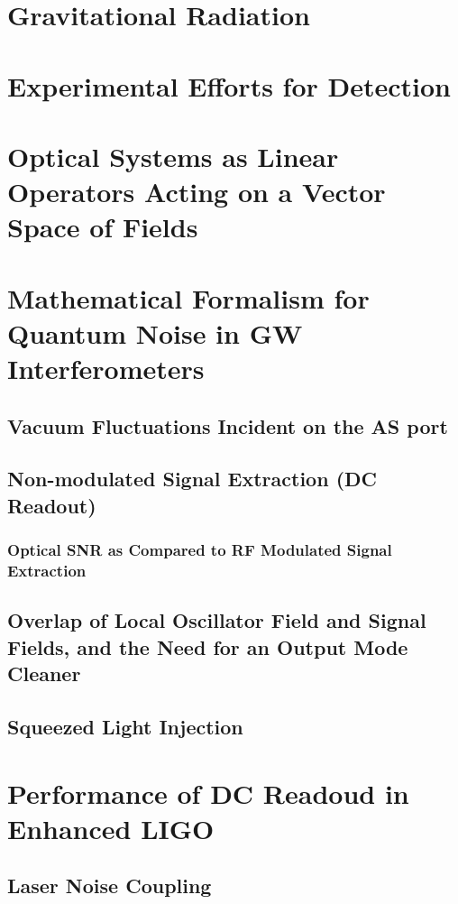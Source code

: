 

\chapter{Gravitational Radiation}

\chapter{Experimental Efforts for Detection}

\chapter{Optical Systems as Linear Operators Acting on a Vector Space of Fields}

\chapter{Mathematical Formalism for Quantum Noise in GW Interferometers}
\section{Vacuum Fluctuations Incident on the AS port}
\section{Non-modulated Signal Extraction (DC Readout)}
\subsection{Optical SNR as Compared to RF Modulated Signal Extraction}
\section{Overlap of Local Oscillator Field and Signal Fields, and the Need for an Output Mode Cleaner}
\section{Squeezed Light Injection}

\chapter{Performance of DC Readoud in Enhanced LIGO}
\section{Laser Noise Coupling}
